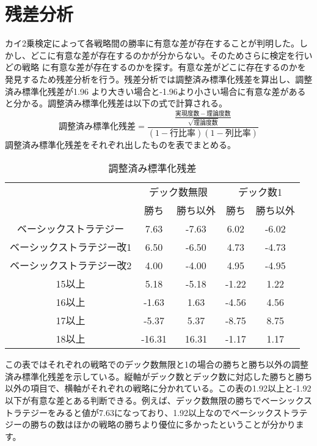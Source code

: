 \section{残差分析}
カイ2乗検定によって各戦略間の勝率に有意な差が存在することが判明した。しかし、どこに有意な差が存在するのかが分からない。そのためさらに検定を行いどの戦略
に有意な差が存在するのかを探す。有意な差がどこに存在するのかを発見するため残差分析を行う。残差分析では調整済み標準化残差を算出し、調整済み標準化残差が1.96
より大きい場合と-1.96より小さい場合に有意な差があると分かる。調整済み標準化残差は以下の式で計算される。
\begin{equation} 調整済み標準化残差 =  \frac{\frac{実現度数 - 理論度数}{\sqrt{理論度数}}}{(1-行比率)(1-列比率)} \end{equation}
調整済み標準化残差をそれぞれ出したものを表でまとめる。
\begin{table}[H]
 \begin{center}
  \begin{tabular}{|c|c|c|c|c|}
    \hline
     & \multicolumn{2}{c|}{デック数無限} & \multicolumn{2}{c|}{デック数1} \\
    \cline{2-5} & 勝ち & 勝ち以外 & 勝ち & 勝ち以外 \\
    \hline ベーシックストラテジー & 7.63 & -7.63 & 6.02 & -6.02  \\
    \hline ベーシックストラテジー改1 & 6.50 & -6.50 & 4.73 & -4.73  \\
    \hline ベーシックストラテジー改2 & 4.00 & -4.00 & 4.95 & -4.95  \\
    \hline 15以上 & 5.18 & -5.18 & -1.22 & 1.22  \\
    \hline 16以上 & -1.63 & 1.63 & -4.56 & 4.56  \\
    \hline 17以上 & -5.37 & 5.37 & -8.75 & 8.75  \\
    \hline 18以上 & -16.31 & 16.31 & -1.17 & 1.17  \\
    \hline
  \end{tabular}
 \end{center}
 \caption{調整済み標準化残差}
\end{table}
この表ではそれぞれの戦略でのデック数無限と1の場合の勝ちと勝ち以外の調整済み標準化残差を示している。縦軸がデック数とデック数に対応した勝ちと勝ち以外の項目で、横軸がそれぞれの戦略に分かれている。この表の1.92以上と-1.92以下が有意な差とある判断できる。例えば、デック数無限の勝ちでベーシックストラテジーをみると値が7.63になっており、1.92以上なのでベーシックストラテジーの勝ちの数はほかの戦略の勝ちより優位に多かったということが分かります。\\
